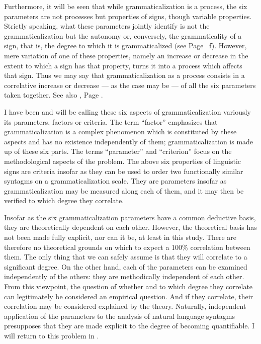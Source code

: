 Furthermore, it will be seen that while grammaticalization is a process, the six parameters are not processes but properties of signs, though variable properties. Strictly speaking, what these parameters jointly identify is not the grammaticalization but the autonomy or, conversely, the grammaticality of a sign, that is, the degree to which it is grammaticalized (see Page~\pageref{page11}\chk%
f). However, mere variation of one of these properties, namely an increase or decrease in the extent to which a sign has that property, turns it into a process which affects that sign. Thus we may say that grammaticalization as a process consists in a correlative increase or decrease — as the case may be — of all the six parameters taken together. See also , Page \pageref{T6}.

I have been and will be calling these six aspects of grammaticalization variously its parameters, factors or criteria. The term ``factor'' emphasizes that grammaticalization is a complex phenomenon which is constituted by these aspects and has no existence independently of them; grammaticalization is made up of these six parts. The terms ``parameter'' and ``criterion'' focus on the methodological aspects of the problem. The above six properties of linguistic signs are criteria insofar as they can be used to order two functionally similar syntagms on a grammaticalization scale. They are parameters insofar as grammaticalization may be measured along each of them, and it may then be verified to which degree they correlate.

Insofar as the six grammaticalization parameters have a common deductive basis, they are theoretically dependent on each other. However, the theoretical basis has not been made fully explicit, nor can it be, at least in this study. There are therefore no theoretical grounds on which to expect a 100\% correlation between them. The only thing that we can safely assume is that they will correlate to a significant degree. On the other hand, each of the parameters can be examined independently of the others: they are methodically independent of each other. From this viewpoint, the question of whether and to which degree they correlate can legitimately be considered an empirical question. And if they correlate, their correlation may be considered explained by the theory. Naturally, independent application of the parameters to the analysis of natural language syntagms presupposes that they are made explicit to the degree of becoming quantifiable. I will return to this problem in .

